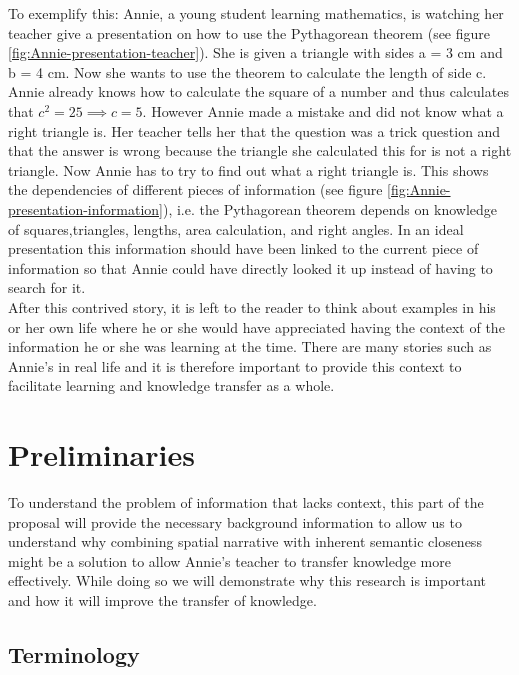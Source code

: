 \documentclass[twoside, 12pt]{article}
\begin{document}
To exemplify this: Annie, a young student learning mathematics, is watching her teacher give a presentation on how to use the Pythagorean theorem (see figure \ref{fig:Annie-presentation-teacher}). She is given a triangle with sides a = 3 cm and b = 4 cm. Now she wants to use the theorem to calculate the length of side c. Annie already knows how to calculate the square of a number and thus calculates that $c^2 = 25 \implies c = 5$. However Annie made a mistake and did not know what a right triangle is. Her teacher tells her that the question was a trick question and that the answer is wrong because the triangle she calculated this for is not a right triangle. Now Annie has to try to find out what a right triangle is. This shows the dependencies of different pieces of information (see figure \ref{fig:Annie-presentation-information}), i.e. the Pythagorean theorem depends on knowledge of squares,triangles, lengths, area calculation, and right angles. In an ideal presentation this information should have been linked to the current piece of information so that Annie could have directly looked it up instead of having to search for it.\\

After this contrived story, it is left to the reader to think about examples in his or her own life where he or she would have appreciated having the context of the information he or she was learning at the time. There are many stories such as Annie's in real life and it is therefore important to provide this context to facilitate learning and knowledge transfer as a whole. \\

\section{Preliminaries}
\label{sec:preliminaries}

To understand the problem of information that lacks context, this part of the proposal will provide the necessary background information to allow us to understand why combining spatial narrative with inherent semantic closeness might be a solution to allow Annie's teacher to transfer knowledge more effectively. While doing so we will demonstrate why this research is important and how it will improve the transfer of knowledge.\\

\subsection{Terminology}
\label{sec:terminology}
\end{document}

